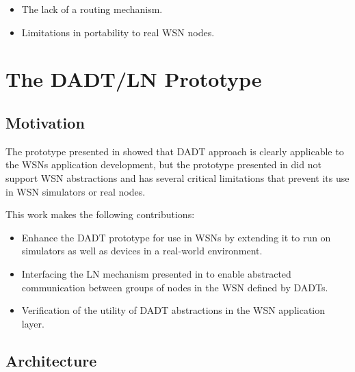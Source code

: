 \begin{itemize}
  \item The lack of a routing mechanism.
  \item Limitations in portability to real WSN nodes.
\end{itemize}



\section{The DADT/LN Prototype}

\subsection{Motivation}

The prototype presented in \cite{migliavacca_DADT:2006} showed that DADT approach
is clearly applicable to the WSNs application development, but the prototype
presented in \cite{migliavacca_DADT:2006} did not support WSN abstractions and
has several critical limitations that prevent its use in WSN simulators or real
nodes.

This work makes the following contributions:

\begin{itemize}
  \item Enhance the DADT prototype for use in WSNs by extending it to run
  on simulators as well as devices in a real-world environment.
  \item Interfacing the LN mechanism presented in \cite{mottola_LNAbstraction}
  to enable abstracted communication between groups of nodes in the WSN defined
  by DADTs.
  \item  Verification of the utility of DADT abstractions in the WSN application
  layer.
\end{itemize}

\subsection{Architecture}


